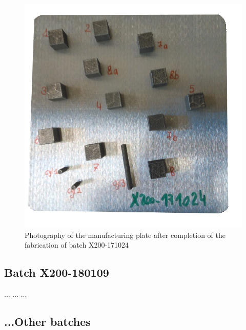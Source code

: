 \begin{figure}[th]
\centering
\includegraphics[scale=0.45]{Images/171024-real}
\decoRule
\caption[Photography of the manufacturing plate after completion of the fabrication of batch X200-171024]{Photography of the manufacturing plate after completion of the fabrication of batch X200-171024}
\label{fig:171024-real}
\end{figure}


\subsection{Batch X200-180109}

... ... ...

\subsection{...Other batches}